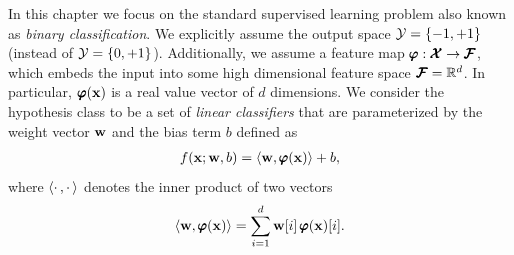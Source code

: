 In this chapter we focus on the standard supervised learning problem also known as \textit{binary classification}.
We explicitly assume the output space $\mathcal{Y}=\{-1,+1\}$ (instead of $\mathcal{Y}=\{0,+1\}$).
Additionally, we assume a feature map $\pmb \varphi:\pmb {\mathcal{X}}\rightarrow\pmb {\mathcal{F}}$, which embeds the input into some high dimensional feature space $\pmb {\mathcal{F}}=\mathbb{R}^d$.
In particular, $\pmb \varphi(\mathbf {x})$ is a real value vector of $d$ dimensions.
We consider the hypothesis class to be a set of \textit{linear classifiers} that are parameterized by the weight vector $\mathbf {w}$ and the bias term $b$ defined as
\begin{align}
	f(\mathbf {x};\mathbf {w},b) = \langle \mathbf {w}, \pmb \varphi(\mathbf {x}) \rangle + b, \label{linearclassifier}
\end{align}
where $\langle \cdot\,, \cdot\, \rangle$ denotes the inner product of two vectors
\begin{align*}
	\langle \mathbf {w}, \pmb \varphi(\mathbf {x}) \rangle = \sum_{i=1}^{d}\mathbf {w}[i]\,\pmb \varphi(\mathbf {x})[i].
\end{align*}
